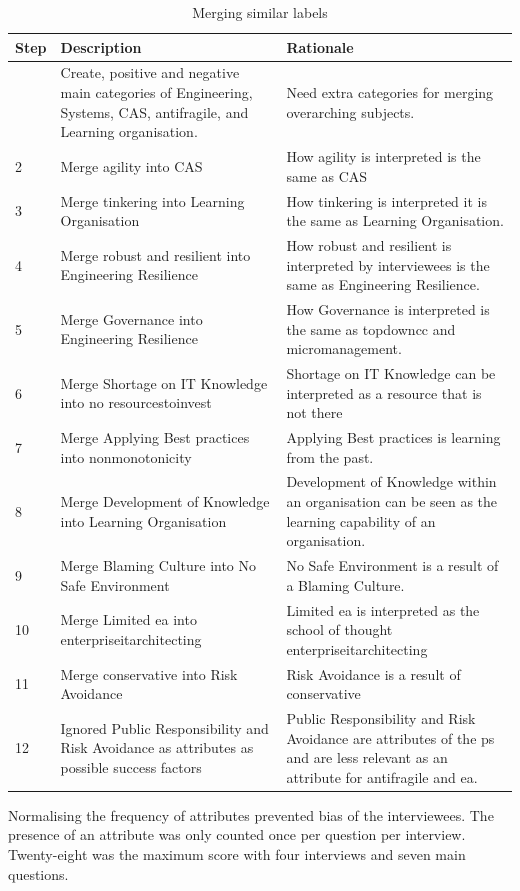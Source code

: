 \begin{longtable}{@{}p{}p{}p{}@{}}
	\toprule%
	\textbf{Step} & \textbf{Description} & \textbf{Rationale} \\%
	\midrule%
	\endhead%
	\hline
	\endfoot%
	\caption[Merging similar labels]{Merging similar labels}
	\label{tab:prepmergingsimilarlabels}
	\endlastfoot%
	1	  & Create, positive and negative main categories of Engineering, Systems, CAS, \gls{antifragile}, and Learning organisation. & Need extra categories for merging overarching subjects. \\%
	2     & Merge \gls{agility} into CAS & How \gls{agility} is interpreted is the same as CAS \\%
	3     & Merge tinkering into Learning Organisation & How tinkering is interpreted it is the same as Learning Organisation. \\%
	4     & Merge \gls{robust} and \gls{resilient} into Engineering Resilience & How \gls{robust} and \gls{resilient} is interpreted by interviewees is the same as Engineering Resilience. \\%
	5     & Merge Governance into Engineering Resilience & How Governance is interpreted is the same as \gls{topdowncc} and \gls{micromanagement}. \\%
	6     & Merge Shortage on IT Knowledge into no \gls{resourcestoinvest} & Shortage on IT Knowledge can be interpreted as a resource that is not there \\%
	7     & Merge Applying Best practices into \gls{nonmonotonicity} & Applying Best practices is learning from the past. \\%
	8     & Merge Development of Knowledge into Learning Organisation & Development of Knowledge within an organisation can be seen as the learning capability of an organisation. \\%
	9     & Merge Blaming Culture into No Safe Environment & No Safe Environment is a result of a Blaming Culture. \\%
	10    & Merge Limited \gls{ea} into \gls{enterpriseitarchitecting} & Limited \gls{ea} is interpreted as the school of thought \gls{enterpriseitarchitecting} \\%
	11    & Merge conservative into Risk Avoidance & Risk Avoidance is a result of conservative \\%
	12	  & Ignored Public Responsibility and Risk Avoidance as \glspl{attribute} as possible success factors & Public Responsibility and Risk Avoidance are attributes of the \gls{ps} and are less relevant as an attribute for \gls{antifragile} and \gls{ea}. \\%
	\bottomrule%
\end{longtable}%
Normalising the frequency of \glspl{attribute} prevented bias of the interviewees. The presence of an attribute was only counted once per question per interview. Twenty-eight was the maximum score with four interviews and seven main questions.
 
